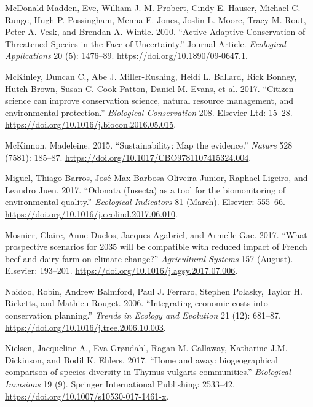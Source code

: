\documentclass[fleqn,10pt]{wlpeerj} %
\begin{document}
\leavevmode\hypertarget{ref-McDonald2010}{}%
McDonald-Madden, Eve, William J. M. Probert, Cindy E. Hauser, Michael C.
Runge, Hugh P. Possingham, Menna E. Jones, Joslin L. Moore, Tracy M.
Rout, Peter A. Vesk, and Brendan A. Wintle. 2010. ``Active Adaptive
Conservation of Threatened Species in the Face of Uncertainty.'' Journal
Article. \emph{Ecological Applications} 20 (5): 1476--89.
\url{https://doi.org/10.1890/09-0647.1}.

\leavevmode\hypertarget{ref-McKinley2017}{}%
McKinley, Duncan C., Abe J. Miller-Rushing, Heidi L. Ballard, Rick
Bonney, Hutch Brown, Susan C. Cook-Patton, Daniel M. Evans, et al. 2017.
``Citizen science can improve conservation science, natural resource
management, and environmental protection.'' \emph{Biological
Conservation} 208. Elsevier Ltd: 15--28.
\url{https://doi.org/10.1016/j.biocon.2016.05.015}.

\leavevmode\hypertarget{ref-McKinnon2015}{}%
McKinnon, Madeleine. 2015. ``Sustainability: Map the evidence.''
\emph{Nature} 528 (7581): 185--87.
\url{https://doi.org/10.1017/CBO9781107415324.004}.

\leavevmode\hypertarget{ref-Miguel2017}{}%
Miguel, Thiago Barros, José Max Barbosa Oliveira-Junior, Raphael
Ligeiro, and Leandro Juen. 2017. ``Odonata (Insecta) as a tool for the
biomonitoring of environmental quality.'' \emph{Ecological Indicators}
81 (March). Elsevier: 555--66.
\url{https://doi.org/10.1016/j.ecolind.2017.06.010}.

\leavevmode\hypertarget{ref-Mosnier2017}{}%
Mosnier, Claire, Anne Duclos, Jacques Agabriel, and Armelle Gac. 2017.
``What prospective scenarios for 2035 will be compatible with reduced
impact of French beef and dairy farm on climate change?''
\emph{Agricultural Systems} 157 (August). Elsevier: 193--201.
\url{https://doi.org/10.1016/j.agsy.2017.07.006}.

\leavevmode\hypertarget{ref-Naidoo2006}{}%
Naidoo, Robin, Andrew Balmford, Paul J. Ferraro, Stephen Polasky, Taylor
H. Ricketts, and Mathieu Rouget. 2006. ``Integrating economic costs into
conservation planning.'' \emph{Trends in Ecology and Evolution} 21 (12):
681--87. \url{https://doi.org/10.1016/j.tree.2006.10.003}.

\leavevmode\hypertarget{ref-Nielsen2017}{}%
Nielsen, Jacqueline A., Eva Grøndahl, Ragan M. Callaway, Katharine J.M.
Dickinson, and Bodil K. Ehlers. 2017. ``Home and away: biogeographical
comparison of species diversity in Thymus vulgaris communities.''
\emph{Biological Invasions} 19 (9). Springer International Publishing:
2533--42. \url{https://doi.org/10.1007/s10530-017-1461-x}.
\end{document}
